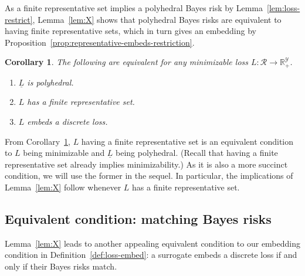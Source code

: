 \documentclass[11pt]{article}
\newcommand{\reals}{\mathbb{R}}
\newcommand{\R}{\mathcal{R}}
\newcommand{\Y}{\mathcal{Y}}
\newcommand{\risk}[1]{\underline{#1}}
\newtheorem{corollary}{Corollary}
\begin{document}
As a finite representative set implies a polyhedral Bayes risk by Lemma~\ref{lem:loss-restrict}, Lemma~\ref{lem:X} shows that polyhedral Bayes risks are equivalent to having finite representative sets, which in turn gives an embedding by
Proposition~\ref{prop:representative-embeds-restriction}.
\begin{corollary}\label{cor:poly-risk-fin-rep}
  The following are equivalent for any minimizable loss $L:\R\to\reals^\Y_+$.
  \begin{enumerate}
  \item $\risk{L}$ is polyhedral.
  \item $L$ has a finite representative set.
  \item $L$ embeds a discrete loss.
  \end{enumerate}
\end{corollary}
From Corollary~\ref{cor:poly-risk-fin-rep}, $L$ having a finite representative set is an equivalent condition to $L$ being minimizable and $\risk{L}$ being polyhedral.
(Recall that having a finite representative set already implies minimizability.)
As it is also a more succinct condition, we will use the former in the sequel.
In particular, the implications of Lemma~\ref{lem:X} follow whenever $L$ has a finite representative set.


\subsection{Equivalent condition: matching Bayes risks}\label{subsec:match-BR}


Lemma~\ref{lem:X} leads to another appealing equivalent condition to our embedding condition in Definition~\ref{def:loss-embed}: a surrogate embeds a discrete loss if and only if their Bayes risks match.
\end{document}
